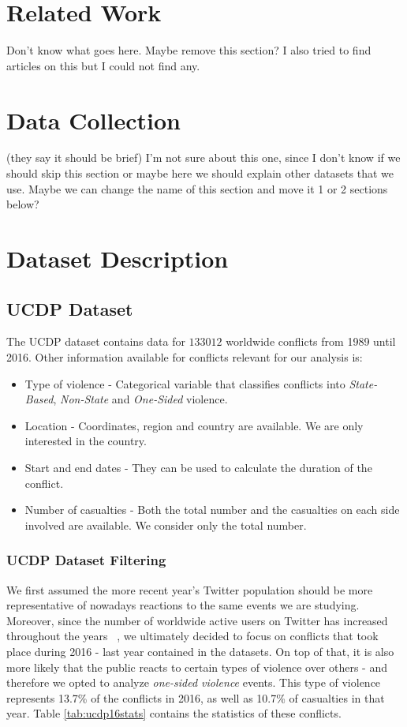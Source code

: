 \documentclass[11pt]{article}
\begin{document}
	
	\section{Related Work}
	Don't know what goes here. Maybe remove this section? I also tried to find
	articles on this but I could not find any.
	
	
	\section{Data Collection}
	(they say it should be brief) I'm not sure about this one, since I don't know if
	we should skip this section or maybe here we should explain other datasets that
	we use. Maybe we can change the name of this section and move it 1 or 2 sections
	below?
	
	
	\section{Dataset Description}
	\subsection{UCDP Dataset}
	\label{sub:ucdp_dataset}
	The UCDP dataset contains data for $133 012$ worldwide conflicts from 1989
	until 2016. Other information available for  conflicts relevant for our analysis
	is:
	\begin{itemize}
		\item Type of violence - Categorical variable that classifies conflicts into
		\emph{State-Based},  \emph{Non-State} and \emph{One-Sided} violence.
		\item Location - Coordinates, region and country are available. We are only
		interested in the country.
		\item Start and end dates - They can be used to calculate the duration of
		the conflict.
		\item Number of casualties - Both the total number and the casualties on
		each side involved are available. We consider only the total number.
	\end{itemize}
	
	\subsubsection*{UCDP Dataset Filtering}
	\label{ssub:dataset_filtering}
	We first assumed the more recent year's Twitter population should be more
	representative of nowadays reactions to the same events we are studying.
	Moreover, since the number of worldwide active users on Twitter has increased
	throughout the years ~\cite{arrojo2015social}, we ultimately decided to focus on
	conflicts that took place during 2016 - last year contained in the datasets. On
	top of that, it is also more likely that the public reacts to certain types of
	violence over others - and therefore we opted to analyze \textit{one-sided
		violence} events. This type of violence represents 13.7\% of the conflicts in
	2016, as well as 10.7\% of casualties in that year. Table \ref{tab:ucdp16stats}
	contains the statistics of these conflicts.
	
\end{document}
